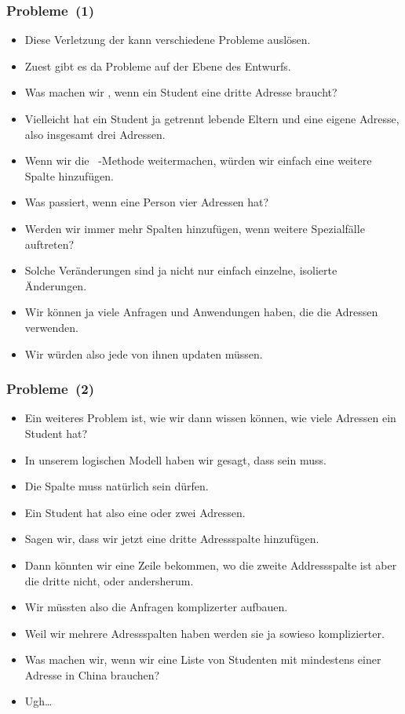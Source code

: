 \documentclass[aspectratio=169,mathserif,notheorems]{beamer}%
\begin{document}
\begin{frame}%
\frametitle{Probleme~(1)}%
\begin{itemize}%
%
\item Diese Verletzung der  kann verschiedene Probleme auslösen.%
%
\item<2-> Zuest gibt es da Probleme auf der Ebene des Entwurfs.%
%
\item<3-> Was machen wir \DEzB, wenn ein Student eine dritte Adresse braucht?%
%
\item<4-> Vielleicht hat ein Student ja getrennt lebende Eltern und eine eigene Adresse, also insgesamt drei Adressen.%
%
\item<5-> Wenn wir die ~-Methode weitermachen, würden wir einfach eine weitere Spalte  hinzufügen.%
%
\item<6-> Was passiert, wenn eine Person vier Adressen hat?%
%
\item<7-> Werden wir immer mehr Spalten hinzufügen, wenn weitere Spezialfälle auftreten?%
%
\item<8-> Solche Veränderungen sind ja nicht nur einfach einzelne, isolierte Änderungen.%
%
\item<9-> Wir können ja viele Anfragen und Anwendungen haben, die die Adressen verwenden.%
%
\item<10-> Wir würden also jede von ihnen updaten müssen.%
\end{itemize}%
\end{frame}%
%
\begin{frame}%
\frametitle{Probleme~(2)}%
\begin{itemize}%
%
\item Ein weiteres Problem ist, wie wir dann wissen können, wie viele Adressen ein Student hat?%
%
\item<2-> In unserem logischen Modell haben wir gesagt, dass   sein muss.%
%
\item<3-> Die Spalte  muss natürlich  sein dürfen.%
%
\item<4-> Ein Student hat also eine oder zwei Adressen.%
%
\item<5-> Sagen wir, dass wir jetzt eine dritte Adressspalte hinzufügen.%
%
\item<6-> Dann könnten wir eine Zeile bekommen, wo die zweite Addressspalte  ist aber die dritte nicht, oder andersherum.%
%
\item<7-> Wir müssten also die Anfragen komplizerter aufbauen.%
%
\item<8-> Weil wir mehrere Adressspalten haben werden sie ja sowieso komplizierter.%
%
\item<9-> Was machen wir, wenn wir eine Liste von Studenten mit mindestens einer Adresse in China brauchen?%
%
\item<10-> Ugh\dots%
\end{itemize}%
\end{frame}%
\end{document}

